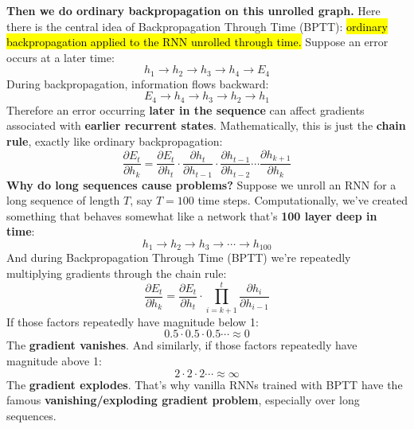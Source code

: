 \highspace
\textcolor{Green3}{ \textbf{Then we do ordinary backpropagation on this unrolled graph.}} Here there is the central idea of Backpropagation Through Time (BPTT): \hl{ordinary backpropagation applied to the RNN unrolled through time.} Suppose an error occurs at a later time:
\begin{equation*}
    h_1 \to h_2 \to h_3 \to h_4 \to E_4
\end{equation*}
During backpropagation, information flows backward:
\begin{equation*}
    E_4 \to h_4 \to h_3 \to h_2 \to h_1
\end{equation*}
Therefore an error occurring \textbf{later in the sequence} can affect gradients associated with \textbf{earlier recurrent states}. Mathematically, this is just the \textbf{chain rule}, exactly like ordinary backpropagation:
\begin{equation*}
    \frac{\partial E_t}{\partial h_k} = \frac{\partial E_t}{\partial h_t} \cdot \frac{\partial h_t}{\partial h_{t-1}} \cdot \frac{\partial h_{t-1}}{\partial h_{t-2}} \cdots \frac{\partial h_{k+1}}{\partial h_k}
\end{equation*}
\textcolor{Red2}{ \textbf{Why do long sequences cause problems?}} Suppose we unroll an RNN for a long sequence of length $T$, say $T = 100$ time steps. Computationally, we've created something that behaves somewhat like a network that's \textbf{100 layer deep in time}:
\begin{equation*}
    h_1 \to h_2 \to h_3 \to \cdots \to h_{100}
\end{equation*}
And during Backpropagation Through Time (BPTT) we're repeatedly multiplying gradients through the chain rule:
\begin{equation*}
    \frac{\partial E_t}{\partial h_k} = \frac{\partial E_t}{\partial h_t} \cdot \prod_{i=k+1}^{t} \frac{\partial h_i}{\partial h_{i-1}}
\end{equation*}
If those factors repeatedly have magnitude below 1:
\begin{equation*}
    0.5 \cdot 0.5 \cdot 0.5 \cdots \approx 0
\end{equation*}
The \textbf{gradient vanishes}. And similarly, if those factors repeatedly have magnitude above 1:
\begin{equation*}
    2 \cdot 2 \cdot 2 \cdots \approx \infty
\end{equation*}
The \textbf{gradient explodes}. That's why vanilla RNNs trained with BPTT have the famous \textbf{vanishing/exploding gradient problem}, especially over long sequences.

